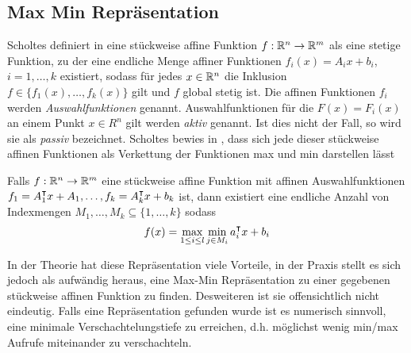 \subsection{Max Min Repräsentation}
\label{sec:maxMinRepresentiation}
Scholtes definiert in \cite[S.19]{scholtes2012introduction} eine stückweise affine Funktion $f:\mathbb{R}^n\to \mathbb{R}^m$ als eine stetige Funktion, zu der eine endliche Menge affiner Funktionen $f_i(x)=A_ix+b_i$, $i=1,\ldots,k$ existiert, sodass für jedes $x\in \mathbb{R}^n$ die Inklusion $f\in\lbrace f_1(x),\ldots, f_k(x)\rbrace $ gilt und $f$ global stetig ist. Die affinen Funktionen $f_i$ werden \textit{Auswahlfunktionen} genannt. 
Auswahlfunktionen für die $F(x) = F_i(x)$ an einem Punkt $x\in R^n$ gilt werden \textit{aktiv} genannt. Ist dies nicht der Fall, so wird sie als \textit{passiv} bezeichnet.
Scholtes bewies in \cite[Prop.2.2.2.]{scholtes2012introduction}, dass sich jede dieser stückweise affinen Funktionen als Verkettung der Funktionen max und min darstellen lässt
\begin{theorem}
 Falls $f:\mathbb{R}^n\to \mathbb{R}^m$ eine stückweise affine Funktion mit affinen Auswahlfunktionen $f_1=A_1^\intercal x+ A_1,\ldots,f_k=A_k^\intercal x+ b_k$ ist, dann existiert eine endliche Anzahl von Indexmengen $M_1,\ldots,M_k\subseteq \lbrace 1,\ldots,k\rbrace$ sodass
 \begin{equation}
 \label{eq:maxMinRepresentiation}
  f(x) = \max_{1\leq i\leq l} \min_{j\in M_i} a_i^\intercal x + b_i
 \end{equation}
 
\end{theorem}
In der Theorie hat diese Repräsentation viele Vorteile, in der Praxis stellt es sich jedoch als aufwändig heraus, eine Max-Min Repräsentation zu einer gegebenen stückweise affinen Funktion zu finden. Desweiteren ist sie offensichtlich nicht eindeutig. Falls eine Repräsentation gefunden wurde ist es numerisch sinnvoll, eine minimale Verschachtelungstiefe zu erreichen, d.h. möglichst wenig min/max Aufrufe miteinander zu verschachteln. 

